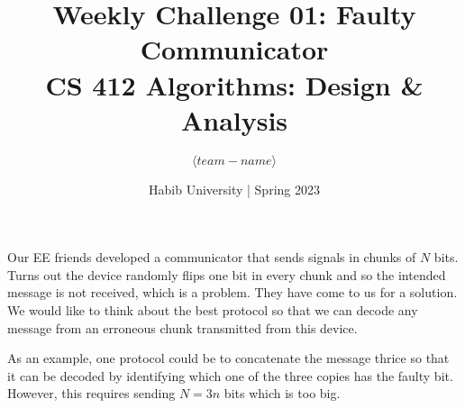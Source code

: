 \documentclass[a4paper]{exam}
\title{Weekly Challenge 01: Faulty Communicator\\CS 412 Algorithms: Design \& Analysis}
\author{$\langle team-name \rangle$}  %
\date{Habib University | Spring 2023}
\begin{document}
\maketitle

\begin{questions}
  

Our EE friends developed a communicator that sends signals in chunks of $N$ bits. Turns out the device randomly flips one bit in every chunk and so the intended message is not received, which is a problem. They have come to us for a solution. We would like to think about the best protocol so that we can decode any message from an erroneous chunk transmitted from this device.

  
As an example, one protocol could be to concatenate the message thrice so that it can be decoded by identifying which one of the three copies has the faulty bit. However, this requires sending $N=3n$ bits which is too big.

\end{questions}
\end{document}
